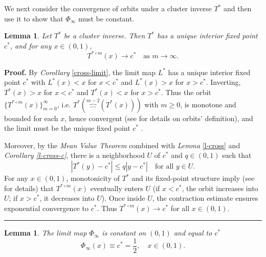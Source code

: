 \documentclass[onecolumn]{article}
\newtheorem{lemma}[theorem]{Lemma}
\newenvironment{proof}[1][Proof]{\noindent\textbf{#1.} }{\ \rule{0.5em}{0.5em}}
\begin{document}
We next consider the convergence of orbits under a cluster inverse $T^{\ast
} $ and then use it to show that $\Phi _{\infty }$ must be constant.

\begin{lemma}
\label{orbit} Let $T^{\ast }$ be a cluster inverse. Then $T^{\ast }$ has a
unique interior fixed point $c^{\ast }$, and for any $x\in (0,1)$, 
\begin{equation}
T^{\ast \circ m}(x)\longrightarrow c^{\ast }\quad \text{as }m\rightarrow
\infty .  \label{589}
\end{equation}
\end{lemma}

\begin{proof}
\noindent By \textit{Corollary} \ref{cross-limit}, the limit map $L^{\ast }$
has a unique interior fixed point $c^{\ast }$ with $L^{\ast }(x)<x$ for $%
x<c^{\ast }$ and $L^{\ast }(x)>x$ for $x>c^{\ast }$. Inverting, $T^{\ast
}(x)>x$ for $x<c^{\ast }$ and $T^{\ast }(x)<x$ for $x>c^{\ast }$. Thus the
orbit $\{T^{\ast \circ m}(x)\}_{m=0}^{\infty }$, i.e. $T^{\ast }(\overset{m-2%
}{\overbrace{...}}(T^{\ast }(x)))$ with $m\geq 0$, is monotone and bounded
for each $x$, hence convergent (see \cite[Chapter 3.2]{[18]} for details on
orbits' definition), and the limit must be the unique fixed point $c^{\ast }$%
.

Moreover, by the \textit{Mean Value Theorem} combined with \textit{Lemma} %
\ref{l-cross} and \textit{Corollary \ref{l-cross-c}}, there is a
neighborhood $U$ of $c^{\ast }$ and $q\in (0,1)$ such that 
\begin{equation*}
|T^{\ast }(y)-c^{\ast }|\leq q|y-c^{\ast }|\quad \text{for all }y\in U.
\end{equation*}%
For any $x\in (0,1)$, monotonicity of $T^{\ast }$ and its fixed-point
structure imply (see \cite[Chapter 5.2]{[18]} for details) that $T^{\ast
\circ m}(x)$ eventually enters $U$ (if $x<c^{\ast }$, the orbit increases
into $U$; if $x>c^{\ast }$, it decreases into $U$). Once inside $U$, the
contraction estimate ensures exponential convergence to $c^{\ast }$. Thus $%
T^{\ast \circ m}(x)\rightarrow c^{\ast }$ for all $x\in (0,1)$.
\end{proof}

\begin{lemma}
\label{Phi-const-direct} The limit map $\Phi _{\infty }$ is constant on $%
(0,1)$ and equal to $c^{\ast }$ 
\begin{equation}
\Phi _{\infty }(x)\equiv c^{\ast }=\frac{1}{2},\quad x\in (0,1).  \label{590}
\end{equation}
\end{lemma}
\end{document}
